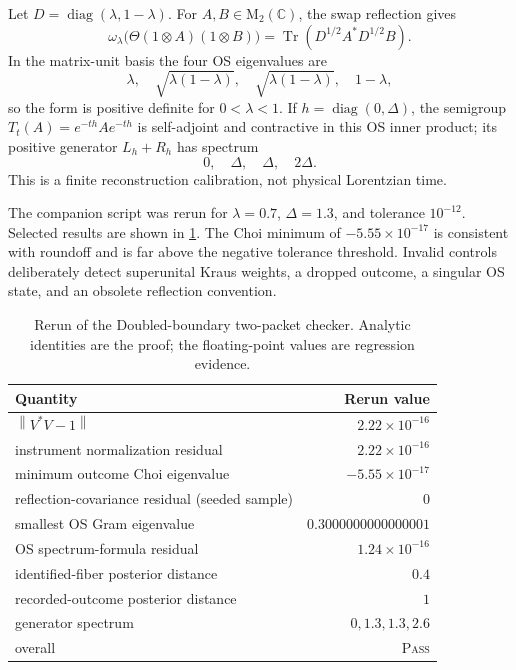 \documentclass[11pt,a4paper]{article}
\theoremstyle{definition}
\theoremstyle{remark}
\newcommand{\C}{\mathbb C}
\newcommand{\M}{\mathrm M}
\newcommand{\Tr}{\operatorname{Tr}}
\newcommand{\norm}[1]{\left\lVert #1\right\rVert}
\newcommand{\status}[1]{\textsc{#1}}
\begin{document}
Let $D=\operatorname{diag}(\lambda,1-\lambda)$.  For $A,B\in\M_2(\C)$, the swap
reflection gives
\begin{equation}
 \omega_\lambda\bigl(\Theta(1\otimes A)(1\otimes B)\bigr)
 =\Tr(D^{1/2}A^*D^{1/2}B).
 \label{eq:weighted-os}
\end{equation}
In the matrix-unit basis the four OS eigenvalues are
\begin{equation}
 \lambda,\quad\sqrt{\lambda(1-\lambda)},\quad
 \sqrt{\lambda(1-\lambda)},\quad1-\lambda,
 \label{eq:os-eigenvalues}
\end{equation}
so the form is positive definite for $0<\lambda<1$.  If
$h=\operatorname{diag}(0,\Delta)$, the semigroup
$T_t(A)=e^{-th}Ae^{-th}$ is self-adjoint and contractive in this OS inner product; its
positive generator $L_h+R_h$ has spectrum
\begin{equation}
 0,\quad\Delta,\quad\Delta,\quad2\Delta.
 \label{eq:generator-spectrum}
\end{equation}
This is a finite reconstruction calibration, not physical Lorentzian time.

The companion script was rerun for $\lambda=0.7$, $\Delta=1.3$, and tolerance
$10^{-12}$.  Selected results are shown in \cref{tab:route-audit}.  The Choi minimum of
$-5.55\times10^{-17}$ is consistent with roundoff and is far above the negative
tolerance threshold.  Invalid controls deliberately detect superunital Kraus weights,
a dropped outcome, a singular OS state, and an obsolete reflection convention.

\begin{table}[t]
\centering
\caption{Rerun of the Doubled-boundary two-packet checker.  Analytic identities are the proof;
the floating-point values are regression evidence.}
\label{tab:route-audit}
\begin{tabular}{@{}lr@{}}
\toprule
Quantity & Rerun value\\
\midrule
$\norm{V^*V-1}$ & $2.22\times10^{-16}$\\
instrument normalization residual & $2.22\times10^{-16}$\\
minimum outcome Choi eigenvalue & $-5.55\times10^{-17}$\\
reflection-covariance residual (seeded sample) & $0$\\
smallest OS Gram eigenvalue & $0.3000000000000001$\\
OS spectrum-formula residual & $1.24\times10^{-16}$\\
identified-fiber posterior distance & $0.4$\\
recorded-outcome posterior distance & $1$\\
generator spectrum & $0,1.3,1.3,2.6$\\
overall & \status{Pass}\\
\bottomrule
\end{tabular}
\end{table}
\end{document}
